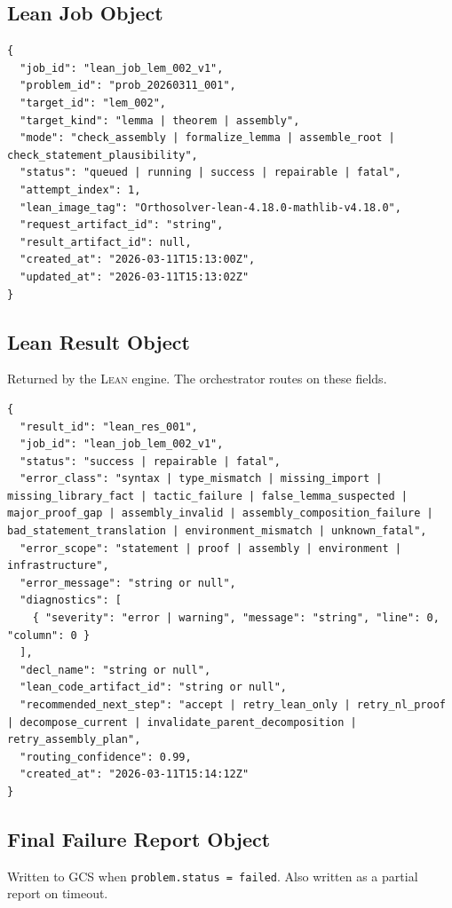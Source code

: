 \documentclass[11pt,a4paper]{article}
\newcommand{\Lean}{\textsc{Lean}}
\begin{document}
\subsection{Lean Job Object}

\begin{lstlisting}
{
  "job_id": "lean_job_lem_002_v1",
  "problem_id": "prob_20260311_001",
  "target_id": "lem_002",
  "target_kind": "lemma | theorem | assembly",
  "mode": "check_assembly | formalize_lemma | assemble_root | check_statement_plausibility",
  "status": "queued | running | success | repairable | fatal",
  "attempt_index": 1,
  "lean_image_tag": "Orthosolver-lean-4.18.0-mathlib-v4.18.0",
  "request_artifact_id": "string",
  "result_artifact_id": null,
  "created_at": "2026-03-11T15:13:00Z",
  "updated_at": "2026-03-11T15:13:02Z"
}
\end{lstlisting}

\subsection{Lean Result Object}
Returned by the \Lean{} engine. The orchestrator routes on these fields.

\begin{lstlisting}
{
  "result_id": "lean_res_001",
  "job_id": "lean_job_lem_002_v1",
  "status": "success | repairable | fatal",
  "error_class": "syntax | type_mismatch | missing_import | missing_library_fact | tactic_failure | false_lemma_suspected | major_proof_gap | assembly_invalid | assembly_composition_failure | bad_statement_translation | environment_mismatch | unknown_fatal",
  "error_scope": "statement | proof | assembly | environment | infrastructure",
  "error_message": "string or null",
  "diagnostics": [
    { "severity": "error | warning", "message": "string", "line": 0, "column": 0 }
  ],
  "decl_name": "string or null",
  "lean_code_artifact_id": "string or null",
  "recommended_next_step": "accept | retry_lean_only | retry_nl_proof | decompose_current | invalidate_parent_decomposition | retry_assembly_plan",
  "routing_confidence": 0.99,
  "created_at": "2026-03-11T15:14:12Z"
}
\end{lstlisting}

\subsection{Final Failure Report Object}
Written to GCS when \texttt{problem.status = failed}. Also written as a partial report on timeout.
\end{document}

